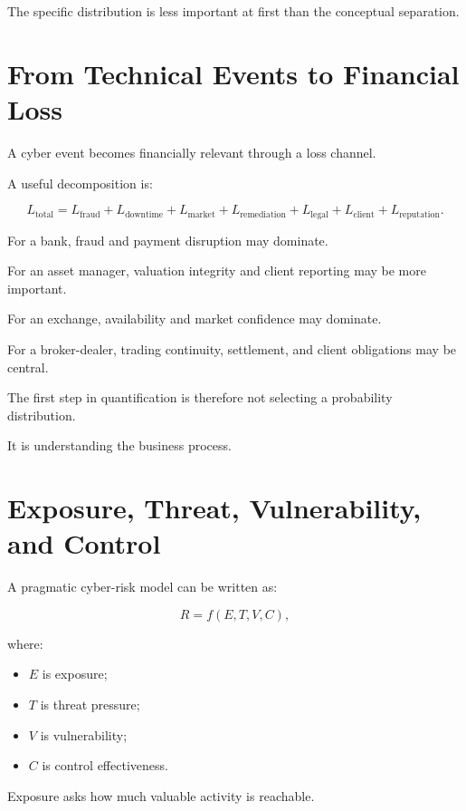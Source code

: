 The specific distribution is less important at first than the conceptual separation.

\section{From Technical Events to Financial Loss}

A cyber event becomes financially relevant through a loss channel.

A useful decomposition is:

\begin{equation}
L_{\text{total}}
=
L_{\text{fraud}}
+
L_{\text{downtime}}
+
L_{\text{market}}
+
L_{\text{remediation}}
+
L_{\text{legal}}
+
L_{\text{client}}
+
L_{\text{reputation}}.
\end{equation}

For a bank, fraud and payment disruption may dominate.

For an asset manager, valuation integrity and client reporting may be more important.

For an exchange, availability and market confidence may dominate.

For a broker-dealer, trading continuity, settlement, and client obligations may be central.

The first step in quantification is therefore not selecting a probability distribution.

It is understanding the business process.

\section{Exposure, Threat, Vulnerability, and Control}

A pragmatic cyber-risk model can be written as:

\begin{equation}
R = f(E,T,V,C),
\end{equation}

where:

\begin{itemize}
    \item \(E\) is exposure;
    \item \(T\) is threat pressure;
    \item \(V\) is vulnerability;
    \item \(C\) is control effectiveness.
\end{itemize}

Exposure asks how much valuable activity is reachable.

